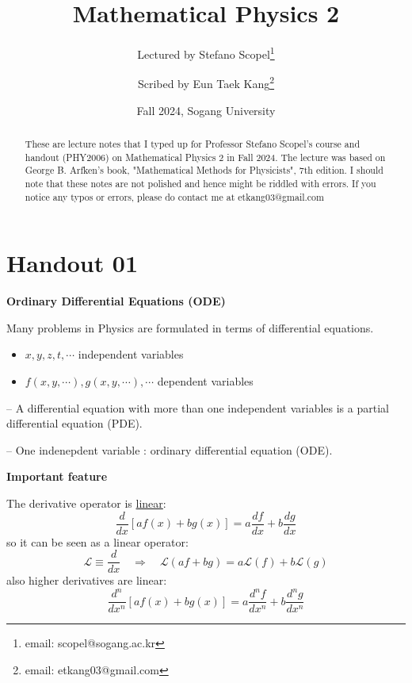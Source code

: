 \documentclass{article}
\title{\textsf{Mathematical Physics 2}}
\author[1]{Lectured by Stefano Scopel\thanks{email: scopel@sogang.ac.kr}}
\author[1]{Scribed by Eun Taek Kang\thanks{email: etkang03@gmail.com}}
\affil[1]{Department of Physics, Sogang University, Seoul 04107, Korea}
\date{Fall 2024, Sogang University}
\begin{document}
\pagestyle{fancy}
    \fancyhf{}
    \fancyfoot[C]{\thepage}

\maketitle

\begin{abstract}
    These are lecture notes that I typed up for Professor Stefano Scopel’s course and handout (PHY2006) on Mathematical Physics 2 in Fall 2024. The lecture was based on George B. Arfken's book, "Mathematical Methods for Physicists", 7th edition. I should note that these notes are not polished and hence might be riddled with errors. If you notice any typos or errors, please do contact me at etkang03@gmail.com
\end{abstract}

\newpage

\section{Handout 01}

\large
\begin{center}
    \textbf{Ordinary Differential Equations (ODE)}
\end{center}

\normalsize
\noindent
Many problems in Physics are formulated in terms of differential equations.
\begin{itemize}
    \item $x, y ,z, t, \cdots$ independent variables
    \item $f(x, y, \cdots), g(x, y, \cdots), \cdots$ dependent variables
\end{itemize}

\noindent
-- A differential equation with more than one independent variables is a partial differential equation (PDE).

\noindent
-- One indenepdent variable : ordinary differential equation (ODE).

\vspace{2mm}
\noindent
\textbf{Important feature}

\noindent
The derivative operator is \underline{linear}:
\begin{equation}
    \frac{d}{dx} [af(x) + bg(x)] = a \frac{df}{dx} + b \frac{dg}{dx}
\end{equation}
so it can be seen as a linear operator:
\begin{equation}
    \mathcal{L} \equiv \frac{d}{dx} \quad \Rightarrow \quad \mathcal{L} (af + bg) = a \mathcal{L} (f) + b \mathcal{L} (g)
\end{equation}
also higher derivatives are linear:
\begin{equation}
    \frac{d^n}{dx^n} [af(x) + bg(x)] = a \frac{d^n f}{dx^n} + b\frac{d^n g}{dx^n}
\end{equation}
\end{document}
